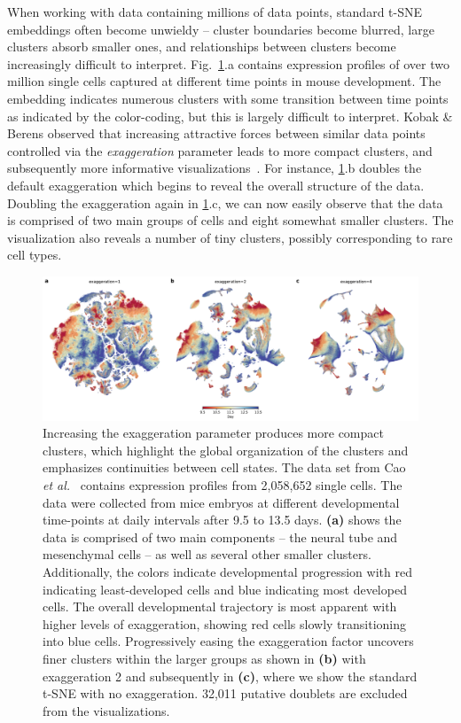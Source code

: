 \documentclass[twocolumn]{bmcart}
\begin{document}
When working with data containing millions of data points, standard t-SNE
embeddings often become unwieldy -- cluster boundaries become blurred, large
clusters absorb smaller ones, and relationships between clusters become
increasingly difficult to interpret. Fig.~\ref{fig:cao}.a contains expression
profiles of over two million single cells captured at different time points in
mouse development. The embedding indicates numerous clusters with some
transition between time points as indicated by the color-coding, but this is
largely difficult to interpret. Kobak \& Berens observed that increasing
attractive forces between similar data points controlled via the
\textit{exaggeration} parameter leads to more compact clusters, and
subsequently more informative visualizations~\cite{kobak2019art}. For instance,
\ref{fig:cao}.b doubles the default exaggeration  which begins to reveal the
overall structure of the data. Doubling the exaggeration again in
\ref{fig:cao}.c, we can now easily observe that the data is comprised of two
main groups of cells and eight somewhat smaller clusters. The visualization
also reveals a number of tiny clusters, possibly corresponding to
rare cell types.

\begin{figure}[htbp]
  \includegraphics[width=\textwidth]{cao2019}
  \caption{\label{fig:cao}Increasing the exaggeration parameter produces more
  	compact clusters, which highlight the global organization of the clusters
  	and emphasizes continuities between cell states. The data set from Cao \textit{et
	al.}~\cite{cao2019single} contains expression profiles from 2,058,652
	single cells. The data were collected from mice embryos at different
	developmental time-points at daily intervals after 9.5 to 13.5 days.
	\textbf{(a)} shows the data is comprised of two main components -- the
	neural tube and mesenchymal cells -- as well as several other smaller
	clusters. Additionally, the colors indicate developmental progression
	with red indicating least-developed cells and blue indicating most
	developed cells. The overall developmental trajectory is most apparent
	with higher levels of exaggeration, showing red cells slowly
	transitioning into blue cells. Progressively easing the exaggeration
	factor uncovers finer clusters within the larger groups as shown in
	\textbf{(b)} with exaggeration 2 and subsequently in \textbf{(c)},
	where we show the standard t-SNE with no exaggeration. 32,011 putative
	doublets are excluded from the visualizations.}
\end{figure}
\end{document}
